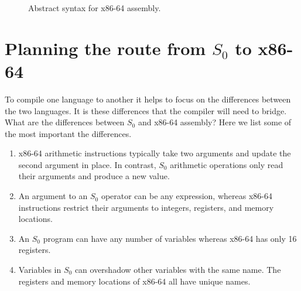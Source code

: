 \documentclass[12pt]{book}
\newcommand{\itm}[1]{\ensuremath{\mathit{#1}}}
\newcommand{\Instr}{\itm{instr}}
\newcommand{\Prog}{\itm{prog}}
\newcommand{\Arg}{\itm{arg}}
\newcommand{\Int}{\itm{int}}
\newcommand{\key}[1]{\texttt{#1}}
\newcommand{\INT}[1]{(\key{int}\;#1)}
\newcommand{\REG}[1]{(\key{reg}\;#1)}
\newcommand{\STACKLOC}[1]{(\key{stack}\;#1)}
\begin{document}
\begin{figure}[tbp]
\fbox{
\begin{minipage}{0.96\textwidth}
\[
\begin{array}{lcl}
\Arg &::=&  \INT{\Int} \mid \REG{\itm{register}}
    \mid \STACKLOC{\Int} \\ 
\Instr &::=& (\key{add} \; \Arg\; \Arg) \mid 
      (\key{sub} \; \Arg\; \Arg) \mid 
      (\key{imul} \; \Arg\;\Arg) \mid 
      (\key{neg} \; \Arg) \mid \\
  && (\key{mov} \; \Arg\; \Arg) \mid 
      (\key{call} \; \mathit{label}) \mid
      (\key{push}\;\Arg) \mid (\key{pop}\;\Arg) \mid (\key{ret}) \\
\Prog &::= & (\key{program} \;\itm{info} \; \Instr^{+})
\end{array}
\]
\end{minipage}
}
\caption{Abstract syntax for x86-64 assembly.}
\label{fig:x86-ast-a}
\end{figure}

\section{Planning the route from $S_0$ to x86-64}
\label{sec:plan-s0-x86}

To compile one language to another it helps to focus on the
differences between the two languages. It is these differences that
the compiler will need to bridge. What are the differences between
$S_0$ and x86-64 assembly? Here we list some of the most important the
differences.

\begin{enumerate}
\item x86-64 arithmetic instructions typically take two arguments and
  update the second argument in place. In contrast, $S_0$ arithmetic
  operations only read their arguments and produce a new value.

\item An argument to an $S_0$ operator can be any expression, whereas
  x86-64 instructions restrict their arguments to integers, registers,
  and memory locations.

\item An $S_0$ program can have any number of variables whereas x86-64
  has only 16 registers.

\item Variables in $S_0$ can overshadow other variables with the same
  name. The registers and memory locations of x86-64 all have unique
  names.
\end{enumerate}
\end{document}
